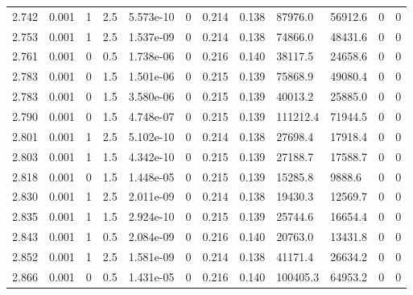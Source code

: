 \documentclass[preview]{standalone}
\begin{document}
{{{{\begin{tabular}{L{1.2cm}C{1.2cm} C{0.3cm}C{0.5cm} C{1.4cm}C{1.4cm} C{1.4cm}C{1.4cm} C{1.6cm}C{1.6cm} C{1.6cm}C{1.6cm}}
  2.742  &  0.001  & 1     & 2.5 &  5.573e-10  & 0  &  0.214&   0.138& 87976.0 & 56912.6   &  0 & 0  \\ 
  2.753  &  0.001  & 1     & 2.5 &  1.537e-09  & 0  &  0.214&   0.138& 74866.0 & 48431.6   &  0 & 0  \\ 
  2.761  &  0.001  & 0     & 0.5 &  1.738e-06  & 0  &  0.216&   0.140& 38117.5 & 24658.6   &  0 & 0  \\ 
  2.783  &  0.001  & 0     & 1.5 &  1.501e-06  & 0  &  0.215&   0.139& 75868.9 & 49080.4   &  0 & 0  \\ 
  2.783  &  0.001  & 0     & 1.5 &  3.580e-06  & 0  &  0.215&   0.139& 40013.2 & 25885.0   &  0 & 0  \\ 
  2.790  &  0.001  & 0     & 1.5 &  4.748e-07  & 0  &  0.215&   0.139& 111212.4 & 71944.5   &  0 & 0  \\ 
  2.801  &  0.001  & 1     & 2.5 &  5.102e-10  & 0  &  0.214&   0.138& 27698.4 & 17918.4   &  0 & 0  \\ 
  2.803  &  0.001  & 1     & 1.5 &  4.342e-10  & 0  &  0.215&   0.139& 27188.7 & 17588.7   &  0 & 0  \\ 
  2.818  &  0.001  & 0     & 1.5 &  1.448e-05  & 0  &  0.215&   0.139& 15285.8 & 9888.6   &  0 & 0  \\ 
  2.830  &  0.001  & 1     & 2.5 &  2.011e-09  & 0  &  0.214&   0.138& 19430.3 & 12569.7   &  0 & 0  \\ 
  2.835  &  0.001  & 1     & 1.5 &  2.924e-10  & 0  &  0.215&   0.139& 25744.6 & 16654.4   &  0 & 0  \\ 
  2.843  &  0.001  & 1     & 0.5 &  2.084e-09  & 0  &  0.216&   0.140& 20763.0 & 13431.8   &  0 & 0  \\ 
  2.852  &  0.001  & 1     & 2.5 &  1.581e-09  & 0  &  0.214&   0.138& 41171.4 & 26634.2   &  0 & 0  \\ 
  2.866  &  0.001  & 0     & 0.5 &  1.431e-05  & 0  &  0.216&   0.140& 100405.3 & 64953.2   &  0 & 0  \\ 
\hline 
\end{tabular} 

}}}}
\end{document}
